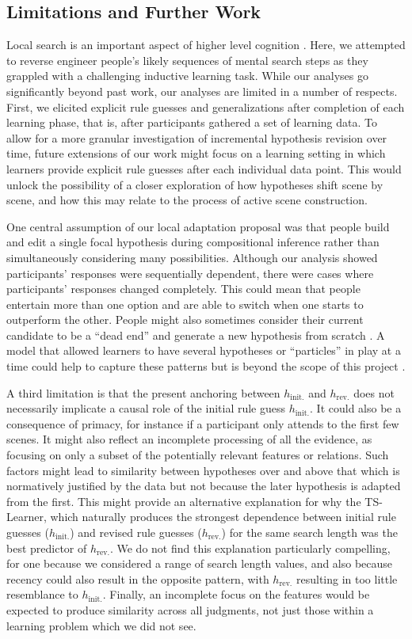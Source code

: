 \documentclass[doc,natbib,floatsintext]{apa7}
\newcommand{\hr}{h_{\mathrm{rev.}}}
\newcommand{\hi}{h_{\mathrm{init.}}}
\begin{document}
\subsection{Limitations and Further Work}
Local search is an important aspect of higher level cognition \citep{hart2020creative, hills2008search, hills2015exploration}. Here, we attempted to reverse engineer people's likely sequences of mental search steps as they grappled with a challenging inductive learning task. While our analyses go significantly beyond past work, our analyses are limited in a number of respects. First, we elicited explicit rule guesses and generalizations after completion of each learning phase, that is, after participants gathered a set of learning data. To allow for a more granular investigation of incremental hypothesis revision over time, future extensions of our work might focus on a learning setting in which learners provide explicit rule guesses after each individual data point. This would unlock the possibility of a closer exploration of how hypotheses shift scene by scene, and how this may relate to the process of active scene construction.

One central assumption of our local adaptation proposal was that people build and edit a single focal hypothesis during compositional inference rather than simultaneously considering many possibilities. Although our analysis showed participants' responses were sequentially dependent, there were cases where participants' responses changed completely. This could mean that people entertain more than one option and are able to switch when one starts to outperform the other. People might also sometimes consider their current candidate to be a ``dead end'' and generate a new hypothesis from scratch \citep{speekenbrink2010learning}. A model that allowed learners to have several hypotheses or ``particles'' in play at a time could help to capture these patterns but is beyond the scope of this project \citep{daw2008pigeon,sanborn2010rational}.

A third limitation is that the present anchoring between $\hi$ and $\hr$ does not necessarily implicate a causal role of the initial rule guess $\hi$. It could also be a consequence of primacy, for instance if a participant only attends to the first few scenes. It might also reflect an incomplete processing of all the evidence, as focusing on only a subset of the potentially relevant features or relations. Such factors might lead to similarity between hypotheses over and above that which is normatively justified by the data but not because the later hypothesis is adapted from the first. This might provide an alternative explanation for why the TS-Learner, which naturally produces the strongest dependence between initial rule guesses ($\hi$) and revised rule guesses ($\hr$) for the same search length was the best predictor of $\hr$. We do not find this explanation particularly compelling, for one because we considered a range of search length values, and also because recency could also result in the opposite pattern, with $\hr$ resulting in too little resemblance to $\hi$. Finally, an incomplete focus on the features would be expected to produce similarity across all judgments, not just those within a learning problem which we did not see.
\end{document}

